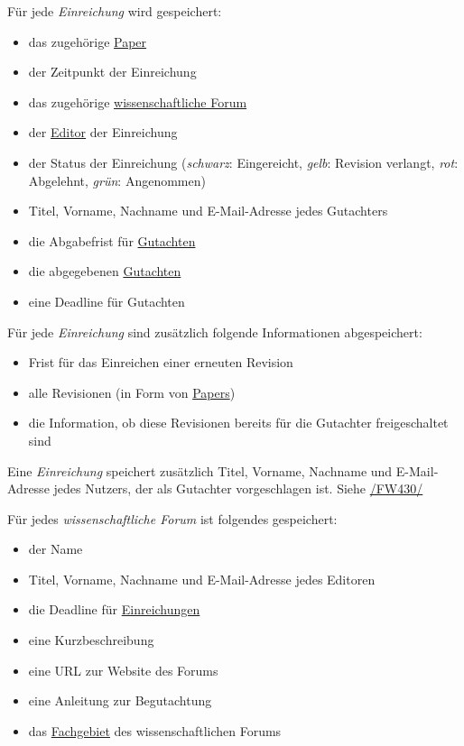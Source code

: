 \begin{description}
	 Für jede \emph{Einreichung} wird gespeichert:
	\begin{itemize}
		\item das zugehörige \hyperref[d020]{Paper}
		\item der Zeitpunkt der Einreichung
		\item das zugehörige \hyperref[d030]{wissenschaftliche Forum}
		\item der \hyperref[funkt:editor]{Editor} der Einreichung
		\item der Status der Einreichung (\emph{schwarz}: Eingereicht, \emph{gelb}: Revision verlangt, \emph{rot}: Abgelehnt, \emph{grün}: Angenommen)
		\item Titel, Vorname, Nachname und E-Mail-Adresse jedes Gutachters
		\item die Abgabefrist für \hyperref[d040]{Gutachten}
		\item die abgegebenen \hyperref[d040]{Gutachten}
		\item eine Deadline für Gutachten
	\end{itemize}

	 Für jede \emph{Einreichung} sind zusätzlich folgende Informationen abgespeichert:
	\begin{itemize}
		\item Frist für das Einreichen einer erneuten Revision
		\item alle Revisionen (in Form von \hyperref[d020]{Papers})
		\item die Information, ob diese Revisionen bereits für die Gutachter freigeschaltet sind
	\end{itemize}

	 Eine \emph{Einreichung} speichert zusätzlich Titel, Vorname, Nachname und E-Mail-Adresse jedes Nutzers, der als Gutachter vorgeschlagen ist.
	Siehe \hyperref[funkt:430]{/FW430/}

	 Für jedes \emph{wissenschaftliche Forum} ist folgendes gespeichert:
	\begin{itemize}
		\item der Name
		\item Titel, Vorname, Nachname und E-Mail-Adresse jedes Editoren
		\item die Deadline für \hyperref[d025]{Einreichungen}
		\item eine Kurzbeschreibung
		\item eine URL zur Website des Forums
		\item eine Anleitung zur Begutachtung
		\item das \hyperref[d035]{Fachgebiet} des wissenschaftlichen Forums
	\end{itemize}


\end{description}
